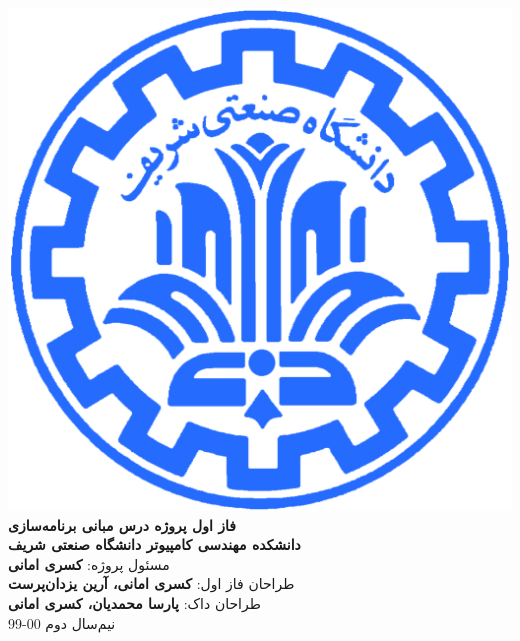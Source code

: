 \documentclass{article}
\begin{document}
    \begin{titlepage}
        \begin{center}
            \includegraphics{./Resources/sharif-large.png} \\
            \vspace{0.5cm}
            \Huge\textbf{فاز اول پروژه درس مبانی برنامه‌سازی} \\
            \vspace{1cm}
            \Large\textbf{دانشکده مهندسی کامپیوتر دانشگاه صنعتی شریف} \\
            \vspace{1cm}
            \Large مسئول پروژه: \textbf{کسری امانی} \\
            \vspace{1cm}
            \Large طراحان فاز اول: \textbf{کسری امانی، آرین یزدان‌پرست} \\
            \vspace{1cm}
            \Large طراحان داک: \textbf{پارسا محمدیان، کسری امانی} \\
            \vspace{1cm}
            \large نیم‌سال دوم 00-99\\
        \end{center}
    \end{titlepage}
\end{document}

